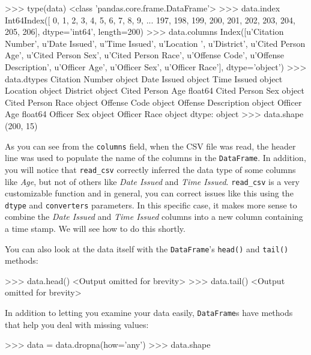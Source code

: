 \begin{lstlistings}
>>> type(data)
<class 'pandas.core.frame.DataFrame'>
>>> data.index
Int64Index([  0,   1,   2,   3,   4,   5,   6,   7,   8,   9,
...
197, 198, 199, 200, 201, 202, 203, 204, 205, 206],
dtype='int64', length=200)
>>> data.columns
Index([u'Citation Number', u'Date Issued', u'Time Issued', u'Location ',
u'District', u'Cited Person Age', u'Cited Person Sex',
u'Cited Person Race', u'Offense Code', u'Offense Description',
u'Officer Age', u'Officer Sex', u'Officer Race'],
dtype='object')
>>> data.dtypes
Citation Number                object
Date Issued                    object
Time Issued                    object
Location                       object
District                       object
Cited Person Age              float64
Cited Person Sex               object
Cited Person Race              object
Offense Code                   object
Offense Description            object
Officer Age                   float64
Officer Sex                    object
Officer Race                   object
dtype: object
>>> data.shape
(200, 15)
\end{lstlistings}

As you can see from the \texttt{columns} field, when the CSV file was
read, the header line was used to populate the name of the columns in
the \texttt{DataFrame}. In addition, you will notice that
\texttt{read\_csv} correctly inferred the data type of some columns like
\emph{Age}, but not of others like \emph{Date Issued} and \emph{Time
Issued}. \texttt{read\_csv} is a very customizable function and in
general, you can correct issues like this using the \texttt{dtype} and
\texttt{converters} parameters. In this specific case, it makes more
sense to combine the \emph{Date Issued} and \emph{Time Issued} columns
into a new column containing a time stamp. We will see how to do this
shortly.

You can also look at the data itself with the \texttt{DataFrame}'s
\texttt{head()} and \texttt{tail()} methods:

\begin{lstlistings}
>>> data.head()
<Output omitted for brevity>
>>> data.tail()
<Output omitted for brevity>
\end{lstlistings}

In addition to letting you examine your data easily, \texttt{DataFrame}s
have methods that help you deal with missing values:

\begin{lstlistings}
>>> data = data.dropna(how='any')
>>> data.shape
\end{lstlistings}


